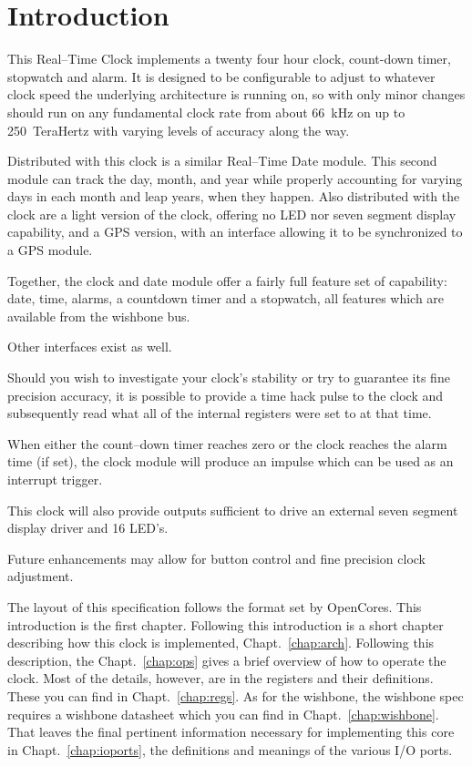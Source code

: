 \documentclass{gqtekspec}
\begin{document}
\chapter{Introduction}
\setcounter{page}{1}

This Real--Time Clock implements a twenty four hour clock, count-down timer,
stopwatch and alarm.  It is designed to be configurable to adjust to whatever
clock speed the underlying architecture is running on, so with only minor
changes should run on any fundamental clock rate from about 66~kHz on up to
250~TeraHertz with varying levels of accuracy along the way.  

Distributed with this clock is a similar Real--Time Date module.  This
second module can track the day, month, and year while properly accounting
for varying days in each month and leap years, when they happen.  Also
distributed with the clock are a light version of the clock, offering no
LED nor seven segment display capability, and a GPS version, with an
interface allowing it to be synchronized to a GPS module.

Together, the clock and date module offer a fairly full feature set of
capability: date, time, alarms, a countdown timer and a stopwatch, all
features which are available from the wishbone bus.

Other interfaces exist as well. 

Should you wish to investigate your clock's stability or try to guarantee
its fine precision accuracy, it is possible to provide a time hack pulse to
the clock and subsequently read what all of the internal registers were set
to at that time.

When either the count--down timer reaches zero or the clock reaches the alarm
time (if set), the clock module will produce an impulse which can be used as
an interrupt trigger.

This clock will also provide outputs sufficient to drive an external seven
segment display driver and 16 LED's.

Future enhancements may allow for button control and fine precision clock
adjustment.

The layout of this specification follows the format set by OpenCores.
This introduction is the first chapter.  Following this introduction is
a short chapter describing how this clock is implemented,
Chapt.~\ref{chap:arch}.  Following this description, the Chapt.~\ref{chap:ops}
gives a brief overview of how to operate the clock.  Most of the details,
however, are in the registers and their definitions.  These you can find in
Chapt.~\ref{chap:regs}.  As for the wishbone, the wishbone spec requires a
wishbone datasheet which you can find in Chapt.~\ref{chap:wishbone}.
That leaves the final pertinent information necessary for implementing this
core in Chapt.~\ref{chap:ioports}, the definitions and meanings of the
various I/O ports.
\end{document}
